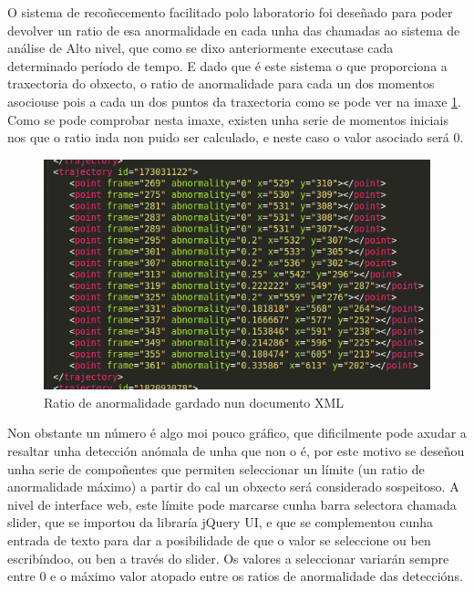     O sistema de recoñecemento facilitado polo laboratorio foi deseñado para poder devolver un ratio
    de esa anormalidade en cada unha das chamadas ao sistema de análise de Alto nivel, que como se 
    dixo anteriormente executase cada determinado período de tempo. E dado que é este sistema o que
    proporciona a traxectoria do obxecto, o ratio de anormalidade para cada un dos momentos 
    asociouse pois a cada un dos puntos da traxectoria como se pode ver na imaxe \ref{fig:abXmlRate}.
    Como se pode comprobar nesta imaxe, existen unha serie de momentos iniciais nos que o ratio inda
    non puido ser calculado, e neste caso o valor asociado será 0.
    
    \begin{figure}[htp]
    \begin{center}
        \includegraphics[scale=0.5]{figures/abXmlRate.png}
        \caption{Ratio de anormalidade gardado nun documento XML}
    \label{fig:abXmlRate}
    \end{center}
    \end{figure}
    
    Non obstante un número é algo moi pouco gráfico, que dificilmente pode axudar a resaltar unha 
    detección anómala de unha que non o é, por este motivo se deseñou unha serie de compoñentes que
    permiten seleccionar un límite (un ratio de anormalidade máximo) a partir do cal un obxecto será
    considerado sospeitoso. A nivel de interface web, este límite pode marcarse cunha barra 
    selectora chamada slider, que  se importou da libraría jQuery UI\cite{ComponenteSliderJqueryUi},
    e que se complementou cunha entrada de texto para dar a posibilidade de que o valor se seleccione
    ou ben escribíndoo, ou ben a través do slider. Os valores a seleccionar variarán sempre entre 0
    e o máximo valor atopado entre os ratios de anormalidade das deteccións.

